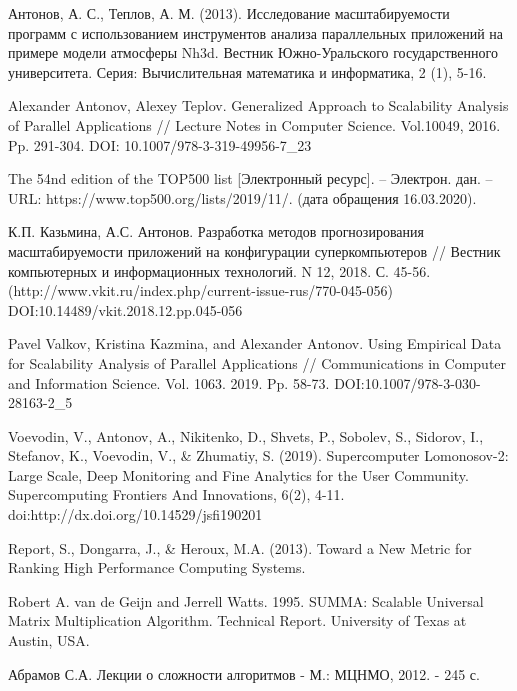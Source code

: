 \begin{thebibliography}{00}
	Антонов, А. С., Теплов, А. М. (2013). Исследование масштабируемости программ с использованием инструментов анализа параллельных приложений на примере модели атмосферы Nh3d. Вестник Южно-Уральского государственного университета. Серия: Вычислительная математика и информатика, 2 (1), 5-16.

	Alexander Antonov, Alexey Teplov. Generalized Approach to Scalability Analysis of Parallel Applications // Lecture Notes in Computer Science. Vol.10049, 2016. Pp. 291-304. DOI: 10.1007/978-3-319-49956-7\_23

  	The 54nd edition of the TOP500 list [Электронный ресурс]. – Электрон. дан. – URL: https://www.top500.org/lists/2019/11/. (дата обращения 16.03.2020).

	К.П. Казьмина, А.С. Антонов. Разработка методов прогнозирования масштабируемости приложений на конфигурации суперкомпьютеров // Вестник компьютерных и информационных технологий. N 12, 2018. С. 45-56.(http://www.vkit.ru/index.php/current-issue-rus/770-045-056) DOI:10.14489/vkit.2018.12.pp.045-056

    Pavel Valkov, Kristina Kazmina, and Alexander Antonov. Using Empirical Data for Scalability Analysis of Parallel Applications // Communications in Computer and Information Science. Vol. 1063. 2019. Pp. 58-73. DOI:10.1007/978-3-030-28163-2\_5

	Voevodin, V., Antonov, A., Nikitenko, D., Shvets, P., Sobolev, S., Sidorov, I., Stefanov, K., Voevodin, V., \& Zhumatiy, S. (2019). Supercomputer Lomonosov-2: Large Scale, Deep Monitoring and Fine Analytics for the User Community. Supercomputing Frontiers And Innovations, 6(2), 4-11. doi:http://dx.doi.org/10.14529/jsfi190201

	Report, S., Dongarra, J., \& Heroux, M.A. (2013). Toward a New Metric for Ranking High Performance Computing Systems.
	
	Robert A. van de Geijn and Jerrell Watts. 1995. SUMMA: Scalable Universal Matrix Multiplication Algorithm. Technical Report. University of Texas at Austin, USA.

	Абрамов С.А. Лекции о сложности алгоритмов - М.: МЦНМО, 2012. - 245 с.




\end{thebibliography}
\clearpage